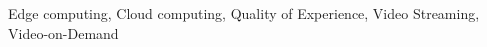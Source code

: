\documentclass[conference]{IEEEtran}
\begin{document}
\begin{abstract}
\end{abstract}

\begin{IEEEkeywords}
Edge computing, Cloud computing, Quality of Experience, Video Streaming, Video-on-Demand
\end{IEEEkeywords}
\end{document}
